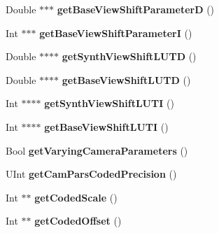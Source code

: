 \begin{DoxyCompactItemize}
\item 
\mbox{\label{class_t_app_com_cam_para_aa58807ba71bbd44c1a702309bc90ef80}} 
Double $\ast$$\ast$$\ast$ {\bfseries get\+Base\+View\+Shift\+ParameterD} ()
\item 
\mbox{\label{class_t_app_com_cam_para_ad858e15d1300e5672a6e030c5544700d}} 
Int $\ast$$\ast$$\ast$ {\bfseries get\+Base\+View\+Shift\+ParameterI} ()
\item 
\mbox{\label{class_t_app_com_cam_para_a5651a4823fb0b4911ff11d02583102e7}} 
Double $\ast$$\ast$$\ast$$\ast$ {\bfseries get\+Synth\+View\+Shift\+L\+U\+TD} ()
\item 
\mbox{\label{class_t_app_com_cam_para_ae8542f736081b84fd90f85df540f523c}} 
Double $\ast$$\ast$$\ast$$\ast$ {\bfseries get\+Base\+View\+Shift\+L\+U\+TD} ()
\item 
\mbox{\label{class_t_app_com_cam_para_a704770af6b5b617ab834fa6e7f8d3448}} 
Int $\ast$$\ast$$\ast$$\ast$ {\bfseries get\+Synth\+View\+Shift\+L\+U\+TI} ()
\item 
\mbox{\label{class_t_app_com_cam_para_a5d165e3c7690c24eb3ba2ae9f43c32cf}} 
Int $\ast$$\ast$$\ast$$\ast$ {\bfseries get\+Base\+View\+Shift\+L\+U\+TI} ()
\item 
\mbox{\label{class_t_app_com_cam_para_a88d91c694fddae263926fd4966a0bb6b}} 
Bool {\bfseries get\+Varying\+Camera\+Parameters} ()
\item 
\mbox{\label{class_t_app_com_cam_para_a1377c6c07c9f94f87f5716fdba837972}} 
U\+Int {\bfseries get\+Cam\+Pars\+Coded\+Precision} ()
\item 
\mbox{\label{class_t_app_com_cam_para_ab7cc26dc9e955d17b73d497a7ea8890e}} 
Int $\ast$$\ast$ {\bfseries get\+Coded\+Scale} ()
\item 
\mbox{\label{class_t_app_com_cam_para_ad6ec02fc84a317d29077170864d083de}} 
Int $\ast$$\ast$ {\bfseries get\+Coded\+Offset} ()
\end{DoxyCompactItemize}
